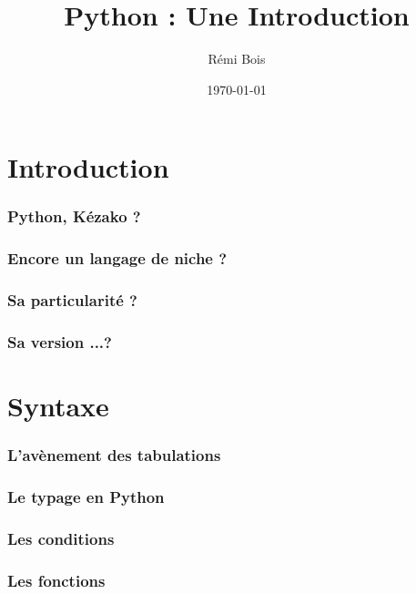 \documentclass{beamer}
\title{Python : Une Introduction}
\institute{ASCII}
\author{Rémi Bois}
\date{\today}
\begin{document}
\begin{frame}
  \maketitle
\end{frame}

\section{Introduction}
\label{sec:intro}

\begin{frame}
  \frametitle{Python, Kézako ?}
\end{frame}

\begin{frame}
  \frametitle{Encore un langage de niche ?}
\end{frame}

\begin{frame}
  \frametitle{Sa particularité ?}
\end{frame}

\begin{frame}
  \frametitle{Sa version ...?}
\end{frame}

\section{Syntaxe}
\label{sec:syntax}

\begin{frame}
  \frametitle{L'avènement des tabulations}
\end{frame}

\begin{frame}
  \frametitle{Le typage en Python}
\end{frame}

\begin{frame}
  \frametitle{Les conditions}
\end{frame}

\begin{frame}
  \frametitle{Les fonctions}
\end{frame}
\end{document}
